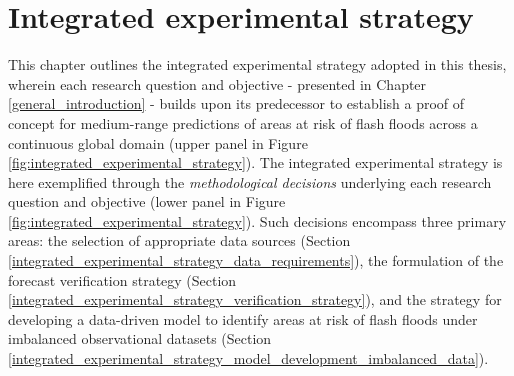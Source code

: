 \chapter{Integrated experimental strategy}
\label{integrated_experimental_strategy}
\graphicspath{{chapter_03/figures}{chapter_03/tables}}


This chapter outlines the integrated experimental strategy adopted in this thesis, wherein each research question and objective - presented in Chapter \ref{general_introduction} - builds upon its predecessor to establish a proof of concept for medium-range predictions of areas at risk of flash floods across a continuous global domain (upper panel in Figure \ref{fig:integrated_experimental_strategy}). The integrated experimental strategy is here exemplified through the \textit{methodological decisions} underlying each research question and objective (lower panel in Figure \ref{fig:integrated_experimental_strategy}). Such decisions encompass three primary areas: the selection of appropriate data sources (Section \ref{integrated_experimental_strategy_data_requirements}), the formulation of the forecast verification strategy (Section \ref{integrated_experimental_strategy_verification_strategy}), and the strategy for developing a data-driven model to identify areas at risk of flash floods under imbalanced observational datasets (Section \ref{integrated_experimental_strategy_model_development_imbalanced_data}). 

